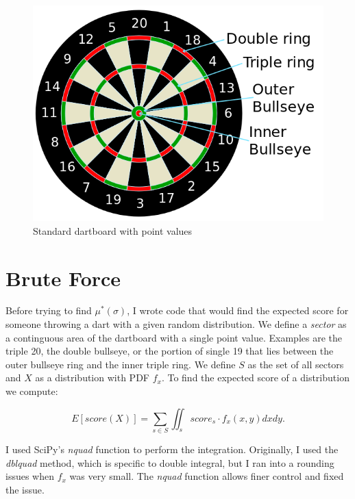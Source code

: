 \documentclass[]{article}
\begin{document}
\begin{figure}
	\centering
	\includegraphics[width=\textwidth]{../images/dartboard_diagram.png}
	\caption{Standard dartboard with point values \cite{diag}}
	\label{fig:diag}
\end{figure}

\section{Brute Force}
Before trying to find $\mu^*(\sigma)$, I wrote code that would find the expected score for someone throwing a dart with a given random distribution. We define a \textit{sector} as a continguous area of the dartboard with a single point value. Examples are the triple 20, the double bullseye, or the portion of single 19 that lies between the outer bullseye ring and the inner triple ring. We define $S$ as the set of all sectors and $X$ as a distribution with PDF $f_x$. To find the expected score of a distribution we compute:


 

\begin{equation}
	E[score(X)] = \sum_{s \in S} \iint_{s} score_s \cdot  f_x(x, y)  dxdy.
	\label{eq:int}
\end{equation}



I used SciPy's \textit{nquad} function to perform the integration. Originally, I used the \textit{dblquad} method, which is specific to double integral, but I ran into a rounding issues when $f_x$ was very small. The \textit{nquad} function allows finer control and fixed the issue. 
\end{document}
